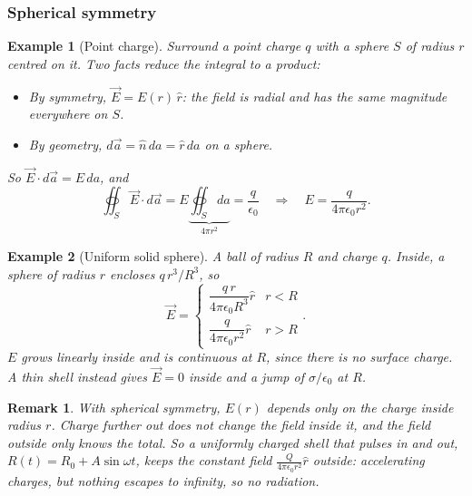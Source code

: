 \documentclass{article}
\newtheorem*{example}{Example}
\newtheorem{remark}{Remark}
\begin{document}
\subsubsection{Spherical symmetry}
\begin{example}[Point charge]
    Surround a point charge $q$ with a sphere $S$ of radius $r$ centred on it. Two facts reduce the integral to a product:
    \begin{itemize}
        \item By symmetry, $\vec{E} = E(r)\,\hat{r}$: the field is radial and has the same magnitude everywhere on $S$.
        \item By geometry, $d\vec{a} = \hat{n}\,da = \hat{r}\,da$ on a sphere.
    \end{itemize}
    So $\vec{E}\cdot d\vec{a} = E\,da$, and
    \[\oiint_S \vec{E}\cdot d\vec{a} = E\underbrace{\oiint_S da}_{4\pi r^2} = \frac{q}{\epsilon_0}\quad\Longrightarrow\quad E = \frac{q}{4\pi\epsilon_0 r^2}.\]
\end{example}
\begin{example}[Uniform solid sphere]
    \label{ex:solid-sphere}
    A ball of radius $R$ and charge $q$. Inside, a sphere of radius $r$ encloses $q\,r^3/R^3$, so
    \[\vec{E} = \begin{cases} \dfrac{q\,r}{4\pi\epsilon_0 R^3}\hat{r} & r < R \\[8pt] \dfrac{q}{4\pi\epsilon_0 r^2}\hat{r} & r > R \end{cases}.\]
    $E$ grows linearly inside and is continuous at $R$, since there is no surface charge. A thin shell instead gives $\vec{E} = 0$ inside and a jump of $\sigma/\epsilon_0$ at $R$.
\end{example}
\begin{remark}
    With spherical symmetry, $E(r)$ depends only on the charge inside radius $r$. Charge further out does not change the field inside it, and the field outside only knows the total. So a uniformly charged shell that pulses in and out, $R(t) = R_0 + A\sin\omega t$, keeps the constant field $\frac{Q}{4\pi\epsilon_0 r^2}\hat{r}$ outside: accelerating charges, but nothing escapes to infinity, so no radiation.
\end{remark}
\end{document}
